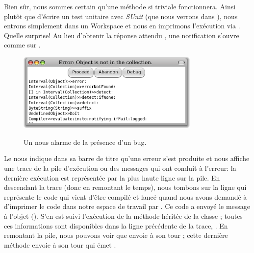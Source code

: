 \documentclass[a4paper,10pt,twoside]{book}
\begin{document}
Bien sûr, nous sommes certain qu'une méthode si triviale fonctionnera.
Ainsi plutôt que d'écrire un test unitaire avec \emph{SUnit} 
(que nous verrons dans ),
nous entrons simplement  dans un Workspace
et nous en imprimons l'exécution via .
Quelle surprise! Au lieu d'obtenir la réponse attendu , 
une notification  s'ouvre comme sur
.

\begin{figure}[btp]
	\begin{center}
		{\includegraphics[width=0.8\textwidth]{PreDebugWindow}}
	\end{center}
	\caption{Un  nous alarme de la présence d'un bug.}
\end{figure}

Le  nous indique dans sa barre de titre
qu'une erreur s'est produite et nous affiche une trace de la pile d'exécution
ou  des messages qui ont conduit à l'erreur:
la dernière exécution est représentée par la plus haute ligne sur la pile.
En descendant la trace (donc en remontant le temps), nous tombons sur la ligne
  qui représente le code qui vient d'être compilé
et lancé quand nous avons demandé à \pharo d'imprimer 
le code  dans notre espace de travail par .
Ce code a envoyé le message  à
l'objet  ().
S'en est suivi l'exécution de la méthode  héritée de la
classe ;
toutes ces informations sont disponibles dans la ligne précédente de la trace,
.
En remontant la pile, nous pouvons voir que  envoie
à son tour ; cette dernière méthode envoie à son tour  qui émet 
.
\end{document}

